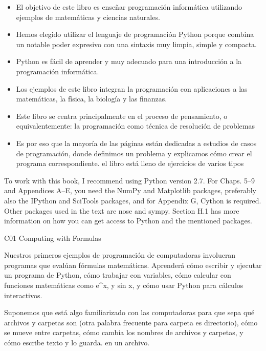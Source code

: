 \begin{frame}

\begin{itemize}
\item El objetivo de este libro es enseñar programación informática utilizando ejemplos de matemáticas y ciencias naturales.

\item Hemos elegido utilizar el lenguaje de programación Python porque combina un notable poder expresivo con una sintaxis muy limpia, simple y compacta. 

\item Python es fácil de aprender y muy adecuado para una introducción a la programación informática.

\item Los ejemplos de este libro integran la programación con aplicaciones a las matemáticas, la física, la biología y las finanzas. 

\item Este libro se centra principalmente en el proceso de pensamiento, o equivalentemente: la programación como técnica de resolución de problemas

\item Es por eso que la mayoría de las páginas están dedicadas a estudios de casos de programación, donde definimos un problema y explicamos cómo crear el programa correspondiente. 
el libro está lleno de ejercicios de varios tipos
\end{itemize}

\end{frame}

\begin{frame}

To work with this book, I recommend using Python version 2.7. For Chaps. 5–9
and Appendices A–E, you need the NumPy and Matplotlib packages, preferably
also the IPython and SciTools packages, and for Appendix G, Cython is required.
Other packages used in the text are nose and sympy. Section H.1 has more information on how you can get access to Python and the mentioned packages.

\end{frame}

\begin{frame}

C01 Computing with Formulas 

Nuestros primeros ejemplos de programación de computadoras involucran programas que evalúan fórmulas matemáticas. Aprenderá cómo escribir y ejecutar un programa de Python, cómo trabajar con variables, cómo calcular con funciones matemáticas como e^x, y sin x, y cómo usar Python para cálculos interactivos.


Suponemos que está algo familiarizado con las computadoras para que sepa qué archivos y carpetas son (otra palabra frecuente para carpeta es directorio), cómo se mueve entre carpetas, cómo cambia los nombres de archivos y carpetas, y cómo escribe texto y lo guarda. en un archivo.

\end{frame}


